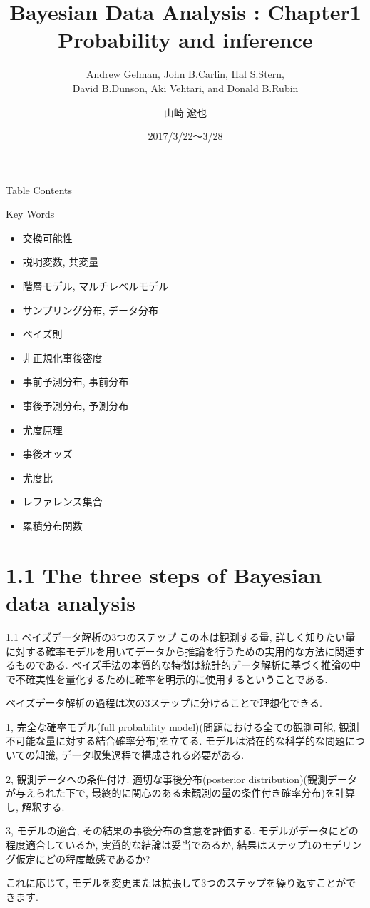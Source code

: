 \documentclass[10pt,dvipdfmx,a4]{beamer}
\title{Bayesian Data Analysis : Chapter1 \\Probability and inference}
\subtitle{Andrew Gelman, John B.Carlin, Hal S.Stern,\\David B.Dunson, Aki Vehtari, and Donald B.Rubin}
\author{山崎 遼也}
\institute{情報学科 数理工学コース 4回}
\date{2017/3/22～3/28}
\begin{document}
\frame{\titlepage}

\begin{frame}{Table Contents}
\begin{multicols}{2}
{\scriptsize \tableofcontents}
\end{multicols}
\end{frame}

\begin{frame}{Key Words}
\begin{multicols}{2}
{\scriptsize \begin{itemize}
\item 交換可能性
\item 説明変数, 共変量
\item 階層モデル, マルチレベルモデル
\item サンプリング分布, データ分布
\item ベイズ則
\item 非正規化事後密度
\item 事前予測分布, 事前分布
\item 事後予測分布, 予測分布
\item 尤度原理
\item 事後オッズ
\item 尤度比
\item レファレンス集合
\item 累積分布関数
\end{itemize}}
\end{multicols}
\end{frame}

\section{1.1 The three steps of Bayesian data analysis}
\begin{frame}{1.1 ベイズデータ解析の3つのステップ}
この本は観測する量, 詳しく知りたい量に対する確率モデルを用いてデータから推論を行うための実用的な方法に関連するものである.
ベイズ手法の本質的な特徴は統計的データ解析に基づく推論の中で不確実性を量化するために確率を明示的に使用するということである.

ベイズデータ解析の過程は次の3ステップに分けることで理想化できる.

1, 完全な確率モデル(full probability model)(問題における全ての観測可能, 観測不可能な量に対する結合確率分布)を立てる.
モデルは潜在的な科学的な問題についての知識, データ収集過程で構成される必要がある.

2, 観測データへの条件付け.
適切な事後分布(posterior distribution)(観測データが与えられた下で, 最終的に関心のある未観測の量の条件付き確率分布)を計算し, 解釈する.

3, モデルの適合, その結果の事後分布の含意を評価する.
モデルがデータにどの程度適合しているか, 実質的な結論は妥当であるか, 結果はステップ1のモデリング仮定にどの程度敏感であるか?

これに応じて, モデルを変更または拡張して3つのステップを繰り返すことができます.
\end{frame}
\end{document}
